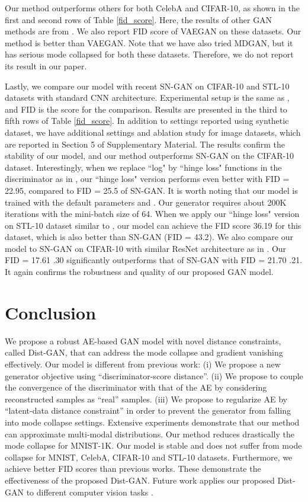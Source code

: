 \documentclass[runningheads]{llncs}
\begin{document}
Our method outperforms others for both CelebA and CIFAR-10, as shown in the first and second rows of Table \ref{fid_score}. Here, the results of other GAN methods are from \cite{lucic-2017-arxiv}. We also report FID score of VAEGAN on these datasets. Our method is better than VAEGAN. Note that we have also tried MDGAN, but it has serious mode collapsed for both these datasets. Therefore, we do not report its result in our paper. 

Lastly, we compare our model with recent SN-GAN \cite{miyato-iclr-2018} on CIFAR-10 and STL-10 datasets with standard CNN architecture. Experimental setup is the same as \cite{miyato-iclr-2018}, and FID is the score for the comparison. Results are presented in the  third to fifth rows of Table \ref{fid_score}. In addition to settings reported using synthetic dataset, we have additional settings and ablation study for image datasets, which are reported in Section 5 of Supplementary Material. The results confirm the stability of our model, and our method outperforms SN-GAN on the CIFAR-10 dataset. Interestingly, when we replace ``log" by ``hinge loss" functions in the discriminator as in \cite{miyato-iclr-2018}, our ``hinge loss" version performs even better with FID = 22.95, compared to FID = 25.5 of SN-GAN. It is worth noting that our model is trained with the default parameters  and . Our generator requires about 200K iterations with the mini-batch size of 64. When we apply our ``hinge loss" version on STL-10 dataset similar to \cite{miyato-iclr-2018}, our model can achieve the FID score 36.19 for this dataset, which is also better than SN-GAN (FID = 43.2). We also compare our model to SN-GAN on CIFAR-10 with similar ResNet architecture as in \cite{miyato-iclr-2018}. Our FID = 17.61  .30 significantly outperforms that of SN-GAN with FID = 21.70  .21. It again confirms the robustness and quality of our proposed GAN model.




 
\section{Conclusion}

We propose a robust AE-based GAN model with novel distance constraints, called Dist-GAN, that can address the mode collapse and gradient vanishing effectively. Our model is different from previous work: (i) We propose a new generator objective using ``discriminator-score distance''. (ii) We propose to couple the convergence of the discriminator with that of the AE by considering reconstructed samples as ``real'' samples. (iii) We propose to  regularize AE by ``latent-data distance constraint'' in order to  prevent the generator from falling into mode collapse settings. Extensive experiments demonstrate that our method can approximate multi-modal distributions. Our method reduces drastically the mode collapse for MNIST-1K. Our model is stable and does not suffer from mode collapse for MNIST, CelebA, CIFAR-10 and STL-10 datasets. Furthermore, we achieve better FID scores than previous works. These demonstrate the effectiveness of the proposed Dist-GAN. Future work applies our proposed Dist-GAN to different computer vision tasks \cite{hoang-acmm-2017,yiluan-cvpr-2018}. 
\end{document}
